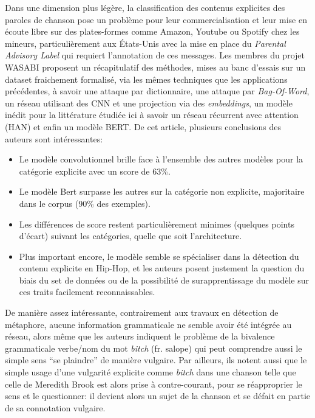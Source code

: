 Dans une dimension plus légère, la classification des contenus explicites des paroles de chanson pose un problème pour leur commercialisation et leur mise en écoute libre sur des plates-formes comme Amazon, Youtube ou Spotify chez les mineurs, particulièrement aux États-Unis avec la mise en place du \textit{Parental Advisory Label} qui requiert l'annotation de ces messages. Les membres du projet WASABI proposent un récapitulatif des méthodes, mises au banc d'essais sur un dataset fraichement formalisé, via les mêmes techniques que les applications précédentes, à savoir une attaque par dictionnaire, une attaque par \textit{Bag-Of-Word}, un réseau utilisant des CNN et une projection via des \textit{embeddings}, un modèle inédit pour la littérature étudiée ici à savoir un réseau récurrent avec attention (HAN) et enfin un modèle BERT. De cet article, plusieurs conclusions des auteurs sont intéressantes:
\begin{itemize}
    \item Le modèle convolutionnel brille face à l'ensemble des autres modèles pour la catégorie explicite avec un score de 63\%.
    \item Le modèle Bert surpasse les autres sur la catégorie non explicite, majoritaire dans le corpus (90\% des exemples).
    \item Les différences de score restent particulièrement minimes (quelques points d'écart) suivant les catégories, quelle que soit l'architecture.
    \item Plus important encore, le modèle semble se spécialiser dans la détection du contenu explicite en Hip-Hop, et les auteurs posent justement la question du biais du set de données ou de la possibilité de surapprentissage du modèle sur ces traits facilement reconnaissables.
\end{itemize}
De manière assez intéressante, contrairement aux travaux en détection de métaphore, aucune information grammaticale ne semble avoir été intégrée au réseau, alors même que les auteurs indiquent le problème de la bivalence grammaticale verbe/nom du mot \textit{bitch} (fr. salope) qui peut comprendre aussi le simple sens \enquote{se plaindre} de manière vulgaire. Par ailleurs, ils notent aussi que le simple usage d'une vulgarité explicite comme \textit{bitch} dans une chanson telle que celle de Meredith Brook est alors prise à contre-courant, pour se réapproprier le sens et le questionner: il devient alors un sujet de la chanson et se défait en partie de sa connotation vulgaire.

